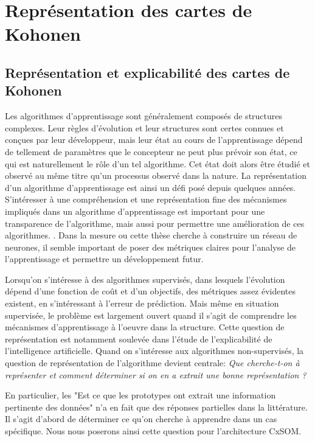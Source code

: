 \chapter{Représentation des cartes de Kohonen}
\graphicspath{{03-Representation/}}

\minitoc
\section{Représentation et explicabilité des cartes de Kohonen}

Les algorithmes d'apprentissage sont généralement composés de structures complexes. Leur règles d'évolution et leur structures sont certes connues et conçues par leur développeur, mais leur état au cours de l'apprentissage dépend de tellement de paramètres que le concepteur ne peut plus prévoir son état, ce qui est naturellement le rôle d'un tel algorithme. Cet état doit alors être étudié et observé au même titre qu'un processus observé dans la nature. La représentation d'un algorithme d'apprentissage est ainsi un défi posé depuis quelques années. S'intéresser à une compréhension et une représentation fine des mécanismes impliqués dans un algorithme d'apprentissage est important pour une transparence de l'algorithme, mais aussi pour permettre une amélioration de ces algorithmes. \cite{Bengio2013RepresentationLA}. Dans la mesure ou cette thèse cherche à construire un réseau de neurones, il semble important de poser des métriques claires pour l'analyse de l'apprentissage et permettre un développement futur. 

Lorsqu'on s'intéresse à des algorithmes supervisés, dans lesquels l'évolution dépend d'une fonction de coût et d'un objectifs, des métriques assez évidentes existent, en s'intéressant à l'erreur de prédiction. Mais même en situation supervisée, le problème est largement ouvert quand il s'agit de comprendre les mécanismes d'apprentissage à l'oeuvre dans la structure. Cette question de représentation est notamment soulevée dans l'étude de l'explicabilité de l'intelligence artificielle. Quand on s'intéresse aux algorithmes non-supervisés, la question de représentation de l'algorithme devient centrale: \emph{Que cherche-t-on à représenter et comment déterminer si on en a extrait une bonne représentation ?}

En particulier, les  "Est ce que les prototypes ont extrait une information pertinente des données" n'a en fait que des réponses partielles dans la littérature. Il s'agit d'abord de déterminer ce qu'on cherche à apprendre dans un cas spécifique. Nous nous poserons ainsi cette question pour l'architecture CxSOM. 
%




